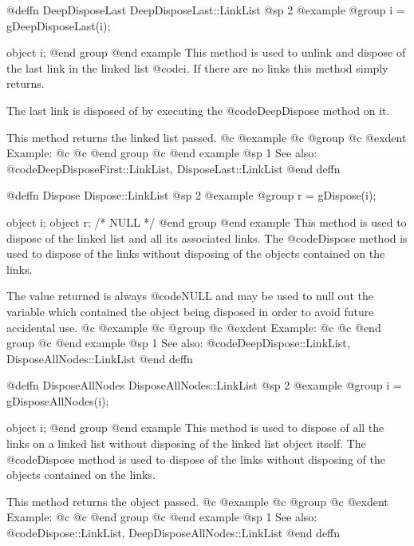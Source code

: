 @deffn {DeepDisposeLast} DeepDisposeLast::LinkList
@sp 2
@example
@group
i = gDeepDisposeLast(i);

object  i;
@end group
@end example
This method is used to unlink and dispose of the last link in the
linked list @code{i}.  If there are no links this method simply
returns.

The last link is disposed of by executing the @code{DeepDispose}
method on it.

This method returns the linked list passed.
@c @example
@c @group
@c @exdent Example:
@c 
@c @end group
@c @end example
@sp 1
See also:  @code{DeepDisposeFirst::LinkList, DisposeLast::LinkList}
@end deffn








@deffn {Dispose} Dispose::LinkList
@sp 2
@example
@group
r = gDispose(i);

object  i;
object  r;     /*  NULL  */
@end group
@end example
This method is used to dispose of the linked list and all its associated
links.  The @code{Dispose} method is used to dispose of the links
without disposing of the objects contained on the links.

The value returned is always @code{NULL} and may be used to null out
the variable which contained the object being disposed in order to
avoid future accidental use.
@c @example
@c @group
@c @exdent Example:
@c 
@c @end group
@c @end example
@sp 1
See also:  @code{DeepDispose::LinkList, DisposeAllNodes::LinkList}
@end deffn










@deffn {DisposeAllNodes} DisposeAllNodes::LinkList
@sp 2
@example
@group
i = gDisposeAllNodes(i);

object  i;
@end group
@end example
This method is used to dispose of all the links on a linked list without
disposing of the linked list object itself.  The @code{Dispose} method
is used to dispose of the links without disposing of the objects
contained on the links.

This method returns the object passed.
@c @example
@c @group
@c @exdent Example:
@c 
@c @end group
@c @end example
@sp 1
See also:  @code{Dispose::LinkList, DeepDisposeAllNodes::LinkList}
@end deffn












